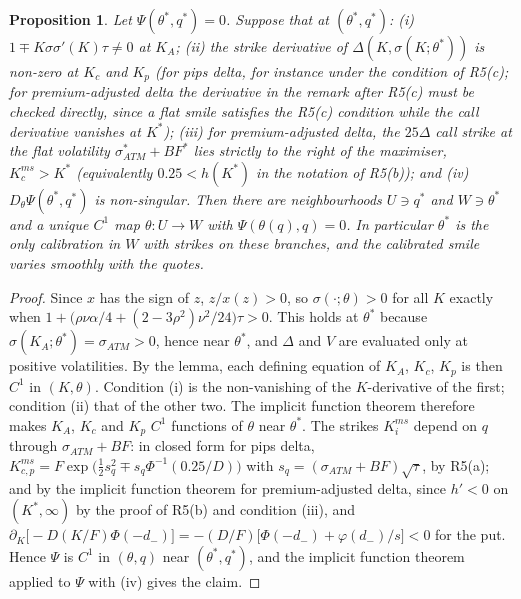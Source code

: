 \documentclass[11pt]{article}
\newtheorem{proposition}{Proposition}
\theoremstyle{remark}
\begin{document}
\begin{proposition}
Let $\Psi(\theta^*,q^*)=0$. Suppose that at $(\theta^*,q^*)$: (i) $1\mp K\sigma\sigma'(K)\tau\ne0$ at $K_A$; (ii) the strike derivative of $\Delta(K,\sigma(K;\theta^*))$ is non-zero at $K_c$ and $K_p$ (for pips delta, for instance under the condition of R5(c); for premium-adjusted delta the derivative in the remark after R5(c) must be checked directly, since a flat smile satisfies the R5(c) condition while the call derivative vanishes at $K^*$); (iii) for premium-adjusted delta, the $25\Delta$ call strike at the flat volatility $\sigma^*_{ATM}+BF^*$ lies strictly to the right of the maximiser, $K^{ms}_c>K^*$ (equivalently $0.25<h(K^*)$ in the notation of R5(b)); and (iv) $D_\theta \Psi(\theta^*,q^*)$ is non-singular. Then there are neighbourhoods $U\ni q^*$ and $W\ni\theta^*$ and a unique $C^1$ map $\theta:U\to W$ with $\Psi(\theta(q),q)=0$. In particular $\theta^*$ is the only calibration in $W$ with strikes on these branches, and the calibrated smile varies smoothly with the quotes.
\end{proposition}

\begin{proof}
Since $x$ has the sign of $z$, $z/x(z)>0$, so $\sigma(\cdot;\theta)>0$ for all $K$ exactly when $1+\bigl(\rho\nu\alpha/4+(2-3\rho^2)\nu^2/24\bigr)\tau>0$. This holds at $\theta^*$ because $\sigma(K_A;\theta^*)=\sigma_{ATM}>0$, hence near $\theta^*$, and $\Delta$ and $V$ are evaluated only at positive volatilities. By the lemma, each defining equation of $K_A$, $K_c$, $K_p$ is then $C^1$ in $(K,\theta)$. Condition (i) is the non-vanishing of the $K$-derivative of the first; condition (ii) that of the other two. The implicit function theorem therefore makes $K_A$, $K_c$ and $K_p$ $C^1$ functions of $\theta$ near $\theta^*$. The strikes $K^{ms}_i$ depend on $q$ through $\sigma_{ATM}+BF$: in closed form for pips delta, $K^{ms}_{c,p}=F\exp\bigl(\tfrac12s_q^2\mp s_q\Phi^{-1}(0.25/D)\bigr)$ with $s_q=(\sigma_{ATM}+BF)\sqrt\tau$, by R5(a); and by the implicit function theorem for premium-adjusted delta, since $h'<0$ on $(K^*,\infty)$ by the proof of R5(b) and condition (iii), and $\partial_K\bigl[-D(K/F)\Phi(-d_-)\bigr]=-(D/F)\bigl[\Phi(-d_-)+\varphi(d_-)/s\bigr]<0$ for the put. Hence $\Psi$ is $C^1$ in $(\theta,q)$ near $(\theta^*,q^*)$, and the implicit function theorem applied to $\Psi$ with (iv) gives the claim.
\end{proof}
\end{document}
